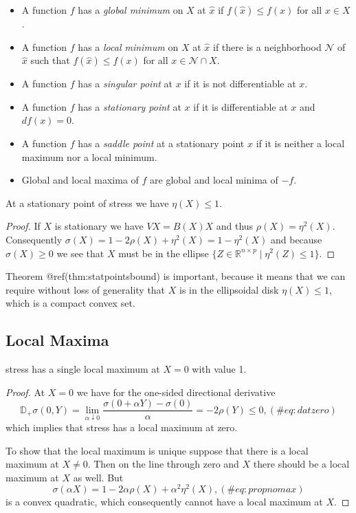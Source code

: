 \documentclass[
  12pt,
  letterpaper,
  DIV=11,
  numbers=noendperiod]{scrreprt}
\theoremstyle{remark}
\begin{document}
\begin{itemize}
\item
  A function \(f\) has a \emph{global minimum} on \(X\) at \(\hat x\) if
  \(f(\hat x)\leq f(x)\) for all \(x\in X\).
\item
  A function \(f\) has a \emph{local minimum} on \(X\) at \(\hat x\) if
  there is a neighborhood \(\mathcal{N}\) of \(\hat x\) such that
  \(f(\hat x)\leq f(x)\) for all \(x\in\mathcal{N}\cap X\).
\item
  A function \(f\) has a \emph{singular point} at \(x\) if it is not
  differentiable at \(x\).
\item
  A function \(f\) has a \emph{stationary point} at \(x\) if it is
  differentiable at \(x\) and \(df(x)=0\).
\item
  A function \(f\) has a \emph{saddle point} at a stationary point \(x\)
  if it is neither a local maximum nor a local minimum.
\item
  Global and local maxima of \(f\) are global and local minima of
  \(-f\).
\end{itemize}

\label{statpointsbound}
At a stationary point of stress we have \(\eta(X)\leq 1\).

\begin{proof}
If \(X\) is stationary we have \(VX=B(X)X\) and thus
\(\rho(X)=\eta^2(X)\). Consequently
\(\sigma(X)=1-2\rho(X)+\eta^2(X)=1-\eta^2(X)\) and because
\(\sigma(X)\geq 0\) we see that \(X\) must be in the ellipse
\(\{Z\in\mathbb{R}^{n\times p}\mid\eta^2(Z)\leq 1\}\).
\end{proof}

Theorem @ref(thm:statpointsbound) is important, because it means that we
can require without loss of generality that \(X\) is in the ellipsoidal
disk \(\eta(X)\leq 1\), which is a compact convex set.

\subsection{Local Maxima}\label{local-maxima}

\label{locmax}
stress has a single local maximum at \(X=0\) with value 1.

\begin{proof}
At \(X=0\) we have for the one-sided directional derivative
\begin{equation}
\mathbb{D}_+\sigma(0,Y)=\lim_{\alpha\downarrow 0}\frac{\sigma(0+\alpha Y)-\sigma(0)}{\alpha}=-2\rho(Y)\leq 0,
(\#eq:datzero)
\end{equation} which implies that stress has a local maximum at zero.

To show that the local maximum is unique suppose that there is a local
maximum at \(X\not= 0\). Then on the line through zero and \(X\) there
should be a local maximum at \(X\) as well. But\\
\begin{equation}
\sigma(\alpha X)=1-2\alpha\rho(X)+\alpha^2\eta^2(X),
(\#eq:propnomax)
\end{equation} is a convex quadratic, which consequently cannot have a
local maximum at \(X\).
\end{proof}
\end{document}

